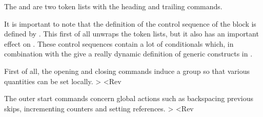 The  and  are two token lists with
the heading and trailing commands.

It is important to note that the definition of the control sequence
of the block is defined by . This first of all unwraps the
token lists, but it also has an important effect on
. These control sequences contain a lot of
conditionals which, in combination with the  give a really
dynamic definition of generic constructs in \Lollipop.

First of all, the opening and closing commands induce a group
so that various quantities can be set locally.
\Ver>
\def\@gen@open{\outer@start@commands 
    \begingroup \inner@start@commands}
\def\@gen@close{\inner@end@commands 
    \endgroup \outer@end@commands}<Rev

The outer start commands concern global actions such as backspacing
previous skips, incrementing counters and setting references.
\Ver>
\def\outer@start@commands{%
    \iftext@construct
        \ifleft@embedded@construct
              \nxp\bsp@hack
        \else \nxp\leavehmode \nxp\bvwit{\the\@whitebefore}\fi<Rev
The `embedded construct' tests are only true if the construct
can be embedded in a paragraph. A~rare occurence most of the time.
\Ver>
        \nxp\if@headed\nxp\else
            \ifforced@break@before\@beforepenalty
            \else\nxp\ifnum\lastpenalty=\z@
                         \@beforepenalty\nxp\fi
            \fi
        \nxp\fi<Rev
A subtle point: a preceding heading will have placed \cs{nobreak} 
followed by a skip. It is dangerous to place any sort of penalty
after this because it might induce a page break.

Now the counter, title, and stuff connected to that.
\Ver>
    \fi
    \ifhas@counter \nxp\StepCounter:\expandafter\@name\@space
Since this is used inside an \cs{edef} we can use some trickery
to get the space token after the argument to \cs{StepCounter}.
\Ver>
        \ifhas@marks \edef\nxp\cs@e
               {\nxp\nxp\nxp\refresh@mark@item
                {\@name Counter}{\CSname{\@name Counter}}}%
            \nxp\cs@e      
        \fi
        \fi
    \iflabel@defined 
        \global\current@label={\the\@labelcoms}\fi
    \ifhas@title \install@title@code<Rev
This title business is explained in~\ref[imp:install:title].
This piece of code also refreshes the title in the mark structure.
This has to be done after any page break for the benefit
of headers/footers.
\Ver>
    \fi
    \ifhas@marks\nxp\ifnin{\nxp\place@mark}\fi
    \nxp\xx@label\the\extern@toks\penalty\@M
    \iftext@construct
        \ifleft@embedded@construct
              \else \nxp\@vwhite{\the\@whitebefore}\fi
    \fi
    }<Rev

